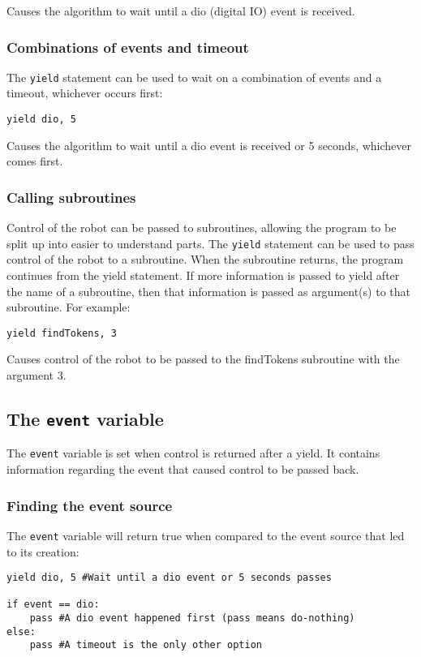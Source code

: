 \documentclass{article}
\begin{document}
Causes the algorithm to wait until a dio (digital IO) event is received.

\subsubsection{Combinations of events and timeout}
The \texttt{yield} statement can be used to wait on a combination of events and
a timeout, whichever occurs first:

\begin{verbatim}
yield dio, 5
\end{verbatim}

Causes the algorithm to wait until a dio event is received or 5 seconds,
whichever comes first.

\subsubsection{Calling subroutines}
Control of the robot can be passed to subroutines, allowing the program to be
split up into easier to understand parts.  The \texttt{yield} statement can be
used to pass control of the robot to a subroutine.  When the subroutine returns,
the program continues from the yield statement.  If more information is
passed to yield after the name of a subroutine, then that information is passed
as argument(s) to that subroutine.  For example:

\begin{verbatim}
yield findTokens, 3
\end{verbatim}

Causes control of the robot to be passed to the findTokens subroutine with the
argument 3.

\subsection{The \texttt{event} variable}
The \texttt{event} variable is set when control is returned after a
yield. It contains information regarding the event that caused control
to be passed back.

\subsubsection{Finding the event source}
The \texttt{event} variable will return true when compared to the
event source that led to its creation:

\begin{verbatim}
yield dio, 5 #Wait until a dio event or 5 seconds passes

if event == dio:
    pass #A dio event happened first (pass means do-nothing)
else:
    pass #A timeout is the only other option
\end{verbatim}
\end{document}
